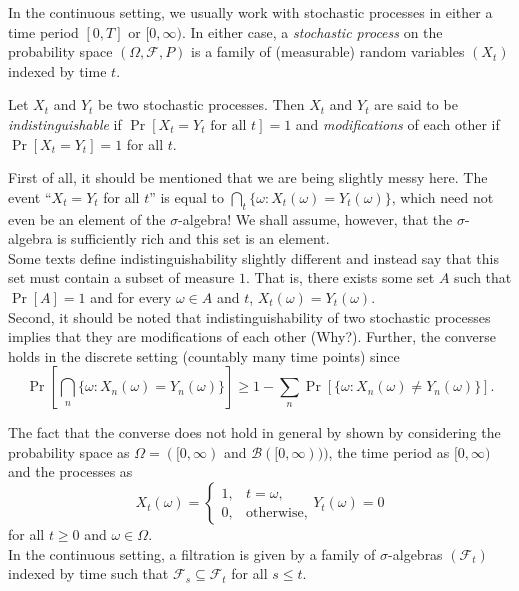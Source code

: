 In the continuous setting, we usually work with stochastic processes in either a time period $[0,T]$ or $[0,\infty)$. In either case, a \textit{stochastic process} on the probability space $(\Omega,\mathcal{F},P)$ is a family of (measurable) random variables $(X_t)$ indexed by time $t$.

\begin{definition}
	\label{def: modification indisting}
	Let $X_t$ and $Y_t$ be two stochastic processes. Then $X_t$ and $Y_t$ are said to be \textit{indistinguishable} if $\Pr[X_t=Y_t\text{ for all }t]=1$ and \textit{modifications} of each other if $\Pr[X_t=Y_t]=1$ for all $t$.
\end{definition}

First of all, it should be mentioned that we are being slightly messy here. The event ``$X_t=Y_t$ for all $t$'' is equal to $\bigcap_t \{\omega : X_t(\omega)=Y_t(\omega)\}$, which need not even be an element of the $\sigma$-algebra! We shall assume, however, that the $\sigma$-algebra is sufficiently rich and this set is an element.\\
Some texts define indistinguishability slightly different and instead say that this set must contain a subset of measure $1$. That is, there exists some set $A$ such that $\Pr[A]=1$ and for every $\omega\in A$ and $t$, $X_t(\omega)=Y_t(\omega)$.\\

Second, it should be noted that indistinguishability of two stochastic processes implies that they are modifications of each other (Why?). Further, the converse holds in the discrete setting (countably many time points) since
\[ \Pr\left[\bigcap_n \{\omega : X_n(\omega)=Y_n(\omega)\}\right] \geq 1 - \sum_{n} \Pr\left[\{\omega : X_n(\omega)\neq Y_n(\omega)\}\right]. \]

The fact that the converse does not hold in general by shown by considering the probability space as $\Omega = ([0,\infty)$ and $\mathcal{B}([0,\infty)))$, the time period as $[0,\infty)$ and the processes as
\[
	X_t(\omega) = 
	\begin{cases}
		1, & t=\omega, \\
		0, & \text{otherwise},
	\end{cases}
	Y_t(\omega) = 0
\]
for all $t\geq 0$ and $\omega\in\Omega$.\\

In the continuous setting, a filtration is given by a family of $\sigma$-algebras $(\mathcal{F}_t)$ indexed by time such that $\mathcal{F}_s \subseteq \mathcal{F}_t$ for all $s\leq t$.

